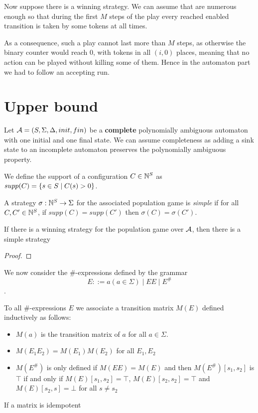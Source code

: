\documentclass{article}
\begin{document}
Now suppose there is a winning strategy. We can assume that are numerous enough so that during the first $M$ steps of the play every reached enabled transition is taken by some tokens at all times.

As a consequence, such a play cannot last more than $M$ steps, as otherwise the binary counter would reach $0$, with tokens in all $(i,0)$ places, meaning that no action can be played without killing some of them.
Hence in the automaton part we had to follow an accepting run.

\section{Upper bound}

Let $\mathcal{A} = (S, \Sigma, \Delta, init, fin)$ be a \textbf{complete} polynomially ambiguous automaton with one initial and one final state. We can assume completeness as adding a sink state to an incomplete automaton preserves the polynomially ambiguous property.

We define the support of a configuration $C \in \mathbb{N}^S$ as $supp(C) = \{ s \in S \mid C(s) > 0 \}$.

A strategy $\sigma : \mathbb{N}^S \to \Sigma$ for the associated population game is \emph{simple} if for all $C, C' \in \mathbb{N}^S$, if $supp(C) = supp(C')$ then $\sigma(C) = \sigma(C')$.



\begin{lemma}
	If there is a winning strategy for the population game over $\mathcal{A}$, then there is a simple strategy  
\end{lemma}

\begin{proof}
	
\end{proof}

We now consider the $\#$-expressions defined by the grammar \[E ::= a (a \in \Sigma) \mid EE \mid E^\#\].

To all $\#$-expressions $E$ we associate a transition matrix $M(E)$ defined inductively as follows:

\begin{itemize}
	\item $M(a)$ is the transition matrix of $a$ for all $a \in \Sigma$.
	
	\item $M(E_1 E_2) = M(E_1) M(E_2)$ for all $E_1, E_2$ 
	
	\item $M(E^\#)$ is only defined if $M(EE) = M(E)$ and then $M(E^\#) [s_1,s_2]$ is $\top$ if and only if $M(E)[s_1, s_2] = \top$, $M(E) [s_2, s_2] = \top$ and $M(E)[s_2, s] = \bot$ for all $s \neq s_2$ 
\end{itemize}

If a matrix is idempotent
\end{document}
